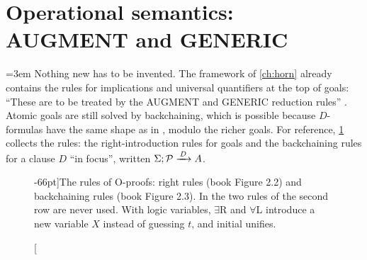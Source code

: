 {\section{Operational semantics: AUGMENT and GENERIC}\label{sec:hh-rules}

{\emergencystretch=3em
Nothing new has to be invented. The framework of \cref{ch:horn} already contains the rules for
implications and universal quantifiers at the top of goals: ``These are to be treated by the AUGMENT and
GENERIC reduction rules'' . Atomic goals are still solved by backchaining, which is possible
because $D$-formulas have the same shape as in \fohc{}, modulo the richer goals. For reference,
\cref{fig:hh-rules} collects the rules: the right-introduction rules for goals and the backchaining rules
for a clause $D$ ``in focus'', written $\Sigma;\mathcal{P}\xrightarrow{\,D\,}A$.\par}

\begin{figure}[t]
\small
{}
\vspace{50pt}%
\caption[][-66pt]{The rules of O-proofs: right rules (book Figure 2.2) and backchaining rules (book Figure 2.3).
In \fohc{} the two rules of the second row are never used. With logic variables, $\exists$R and
$\forall$L introduce a new variable $X$ instead of guessing $t$, and initial unifies.}
\label{fig:hh-rules}
\end{figure}

}
